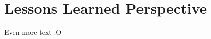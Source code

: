 \documentclass[report/main.tex]{subfiles}
\begin{document}
    \section{Lessons Learned Perspective}
    \label{Sec:lessons_learned_persective}
        Even more text :O
\end{document}
